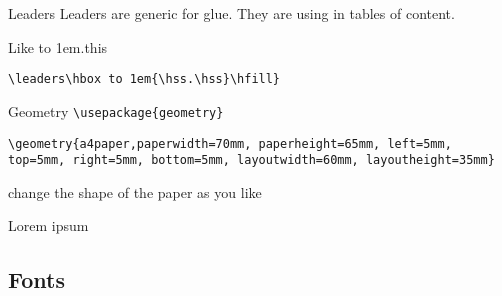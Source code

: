 \begin{frame}[fragile]{Leaders}\relax
     Leaders are generic for glue. They are using in tables of content.
     
     Like \leaders\hbox to 1em{\hss.\hss}\hfill this
     
     \verb|\leaders\hbox to 1em{\hss.\hss}\hfill}|
\end{frame}

\begin{frame}[fragile]{Geometry\magicPage}\relax
     \lstinline[basicstyle=\tt]|\usepackage{geometry}|
     
\lstinline[basicstyle=\tt]|\geometry{a4paper,paperwidth=70mm, paperheight=65mm, left=5mm, top=5mm, right=5mm, bottom=5mm, layoutwidth=60mm, layoutheight=35mm}|
     
     change the shape of the paper as you like
\end{frame}

\begin{frame}[fragile]{Lorem ipsum\magicPage}\relax
\cprotect{}
     
\end{frame}

\subsection{Fonts}

